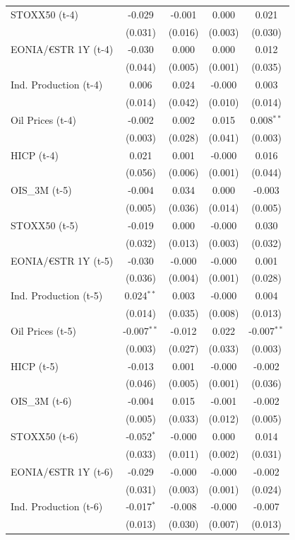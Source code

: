 \begin{longtable}[t]{lcccc}
STOXX50 (t-4) & -0.029 & -0.001 & 0.000 & 0.021\\
 & (0.031) & (0.016) & (0.003) & (0.030)\\
EONIA/€STR 1Y (t-4) & -0.030 & 0.000 & 0.000 & 0.012\\
 & (0.044) & (0.005) & (0.001) & (0.035)\\
Ind. Production (t-4) & 0.006 & 0.024 & -0.000 & 0.003\\
 & (0.014) & (0.042) & (0.010) & (0.014)\\
Oil Prices (t-4) & -0.002 & 0.002 & 0.015 & 0.008$^{**}$\\
 & (0.003) & (0.028) & (0.041) & (0.003)\\
HICP (t-4) & 0.021 & 0.001 & -0.000 & 0.016\\
 & (0.056) & (0.006) & (0.001) & (0.044)\\
OIS\_3M (t-5) & -0.004 & 0.034 & 0.000 & -0.003\\
 & (0.005) & (0.036) & (0.014) & (0.005)\\
STOXX50 (t-5) & -0.019 & 0.000 & -0.000 & 0.030\\
 & (0.032) & (0.013) & (0.003) & (0.032)\\
EONIA/€STR 1Y (t-5) & -0.030 & -0.000 & -0.000 & 0.001\\
 & (0.036) & (0.004) & (0.001) & (0.028)\\
Ind. Production (t-5) & 0.024$^{**}$ & 0.003 & -0.000 & 0.004\\
 & (0.014) & (0.035) & (0.008) & (0.013)\\
Oil Prices (t-5) & -0.007$^{**}$ & -0.012 & 0.022 & -0.007$^{**}$\\
 & (0.003) & (0.027) & (0.033) & (0.003)\\
HICP (t-5) & -0.013 & 0.001 & -0.000 & -0.002\\
 & (0.046) & (0.005) & (0.001) & (0.036)\\
OIS\_3M (t-6) & -0.004 & 0.015 & -0.001 & -0.002\\
 & (0.005) & (0.033) & (0.012) & (0.005)\\
STOXX50 (t-6) & -0.052$^{*}$ & -0.000 & 0.000 & 0.014\\
 & (0.033) & (0.011) & (0.002) & (0.031)\\
EONIA/€STR 1Y (t-6) & -0.029 & -0.000 & -0.000 & -0.002\\
 & (0.031) & (0.003) & (0.001) & (0.024)\\
Ind. Production (t-6) & -0.017$^{*}$ & -0.008 & -0.000 & -0.007\\
 & (0.013) & (0.030) & (0.007) & (0.013)\\

\end{longtable}
